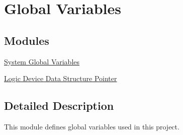 \hypertarget{group___global_variables}{\section{Global Variables}
\label{group___global_variables}
}
\subsection*{Modules}
\begin{DoxyCompactItemize}
\item 
\hyperlink{group___sys_glb_var}{System Global Variables}
\item 
\hyperlink{group___log_dev_dat_str_ptr}{Logic Device Data Structure Pointer}
\end{DoxyCompactItemize}


\subsection{Detailed Description}
This module defines global variables used in this project. 